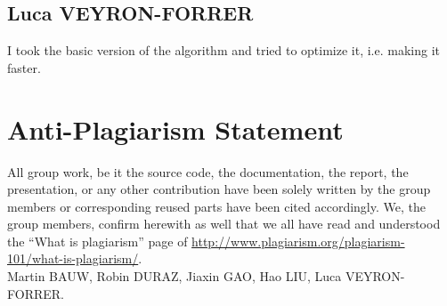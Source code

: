 \documentclass{article}
\begin{document}
\subsection{Luca VEYRON-FORRER}
I took the basic version of the algorithm and tried to optimize it, i.e. making
it faster.

\section{Anti-Plagiarism Statement}
All group work, be it the source code, the documentation, the report, the presentation, or any other contribution have been solely written by the group members or corresponding reused parts have been cited accordingly. We, the group members, confirm herewith as well that we all have read and understood the ``What is plagiarism'' page of \url{http://www.plagiarism.org/plagiarism-101/what-is-plagiarism/}.\\


Martin BAUW, Robin DURAZ, Jiaxin GAO, Hao LIU, Luca VEYRON-FORRER.
\end{document}
